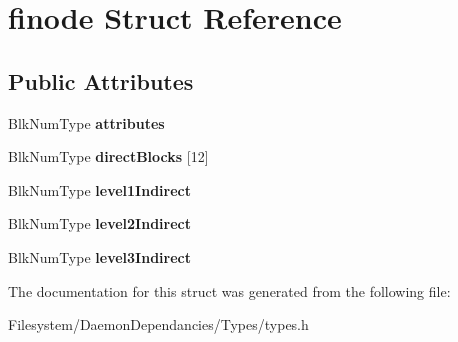 \hypertarget{structfinode}{}\section{finode Struct Reference}
\label{structfinode}
\subsection*{Public Attributes}
\begin{DoxyCompactItemize}
\item 
Blk\+Num\+Type {\bfseries attributes}\hypertarget{structfinode_acea49fb643c2e6a421d4d4ed674fe2c8}{}\label{structfinode_acea49fb643c2e6a421d4d4ed674fe2c8}

\item 
Blk\+Num\+Type {\bfseries direct\+Blocks} \mbox{[}12\mbox{]}\hypertarget{structfinode_ad2e7c7bf4f5653afac46fb609f4a04bd}{}\label{structfinode_ad2e7c7bf4f5653afac46fb609f4a04bd}

\item 
Blk\+Num\+Type {\bfseries level1\+Indirect}\hypertarget{structfinode_a0d707b42974c4777cd5ff71e3b70ed5a}{}\label{structfinode_a0d707b42974c4777cd5ff71e3b70ed5a}

\item 
Blk\+Num\+Type {\bfseries level2\+Indirect}\hypertarget{structfinode_a758697bad925160db4e1e08b1d51550c}{}\label{structfinode_a758697bad925160db4e1e08b1d51550c}

\item 
Blk\+Num\+Type {\bfseries level3\+Indirect}\hypertarget{structfinode_a6c3fe6a69987a36fdfeae3acc8904edb}{}\label{structfinode_a6c3fe6a69987a36fdfeae3acc8904edb}

\end{DoxyCompactItemize}


The documentation for this struct was generated from the following file\+:\begin{DoxyCompactItemize}
\item 
Filesystem/\+Daemon\+Dependancies/\+Types/types.\+h\end{DoxyCompactItemize}
